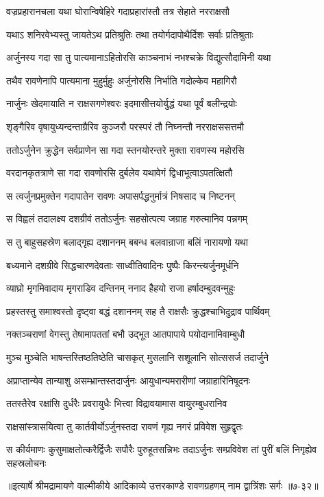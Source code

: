 \twolineshloka
{वज्रप्रहारानचला यथा घोरान्विषेहिरे}
{गदाप्रहारांस्तौ तत्र सेहाते नरराक्षसौ} %

\twolineshloka
{यथाऽ शनिरवेभ्यस्तु जायतेऽथ प्रतिश्रुतिः}
{तथा तयोर्गदापोथैर्दिशः सर्वाः प्रतिश्रुताः} %

\twolineshloka
{अर्जुनस्य गदा सा तु पात्यमानाऽहितोरसि}
{काञ्चनाभं नभश्चक्रे विद्युत्सौदामिनी यथा} %

\twolineshloka
{तथैव रावणेनापि पात्यमाना मुहुर्मुहुः}
{अर्जुनोरसि निर्भाति गदोल्केव महागिरौ} %

\twolineshloka
{नार्जुनः खेदमायाति न राक्षसगणेश्वरः}
{इदमासीत्तयोर्युद्धं यथा पूर्वं बलीन्द्रयोः} %

\twolineshloka
{शृङ्गैरिव वृषायुध्यन्दन्ताग्रैरिव कुञ्जरौ}
{परस्परं तौ निघ्नन्तौ नरराक्षससत्तमौ} %

\twolineshloka
{ततोऽर्जुनेन क्रुद्धेन सर्वप्राणेन सा गदा}
{स्तनयोरन्तरे मुक्ता रावणस्य महोरसि} %

\twolineshloka
{वरदानकृतत्राणे सा गदा रावणोरसि}
{दुर्बलेव यथावेगं द्विधाभूत्वाऽपतत्क्षितौ} %

\twolineshloka
{स त्वर्जुनप्रमुक्तेन गदापातेन रावणः}
{अपासर्पद्धनुर्मात्रं निषसाद च निष्टनन्} %

\twolineshloka
{स विह्वलं तदालक्ष्य दशग्रीवं ततोऽर्जुनः}
{सहसोत्पत्य जग्राह गरुत्मानिव पन्नगम्} %

\twolineshloka
{स तु बाहुसहस्रेण बलाद्गृह्य दशाननम्}
{बबन्ध बलवान्राजा बलिं नारायणो यथा} %

\twolineshloka
{बध्यमाने दशग्रीवे सिद्धचारणदेवताः}
{साध्वीतिवादिनः पुष्पैः किरन्त्यर्जुनमूर्धनि} %

\twolineshloka
{व्याघ्रो मृगमिवादाय मृगराडिव दन्तिनम्}
{ननाद हैहयो राजा हर्षादम्बुदवन्मुहुः} %

\twolineshloka
{प्रहस्तस्तु समाश्वस्तो दृष्ट्वा बद्धं दशाननम्}
{सह तै राक्षसैः क्रुद्धश्चाभिदुद्राव पार्थिवम्} %

\twolineshloka
{नक्तञ्चराणां वेगस्तु तेषामापततां बभौ}
{उद्भूत आतपापाये पयोदानामिवाम्बुधौ} %

\twolineshloka
{मुञ्च मुञ्चेति भाषन्तस्तिष्ठतिष्ठेति चासकृत्}
{मुसलानि सशूलानि सोत्ससर्ज तदार्जुने} %

\twolineshloka
{अप्राप्तान्येव तान्याशु असम्भ्रान्तस्तदार्जुनः}
{आयुधान्यमरारीणां जग्राहारिनिषूदनः} %

\twolineshloka
{ततस्तैरेव रक्षांसि दुर्धरैः प्रवरायुधैः}
{भित्त्वा विद्रावयामास वायुरम्बुधरानिव} %

\twolineshloka
{राक्षसांस्त्रासयित्वा तु कार्तवीर्योऽर्जुनस्तदा}
{रावणं गृह्य नगरं प्रविवेश सुहृद्वृतः} %

\twolineshloka
{स कीर्यमाणः कुसुमाक्षतोत्करैर्द्विजैः सपौरैः पुरुहूतसन्निभः}
{तदाऽर्जुनः सम्प्रविवेश तां पुरीं बलिं निगृह्येव सहस्रलोचनः} %


॥इत्यार्षे श्रीमद्रामायणे वाल्मीकीये आदिकाव्ये उत्तरकाण्डे रावणग्रहणम् नाम द्वात्रिंशः सर्गः ॥७-३२॥
